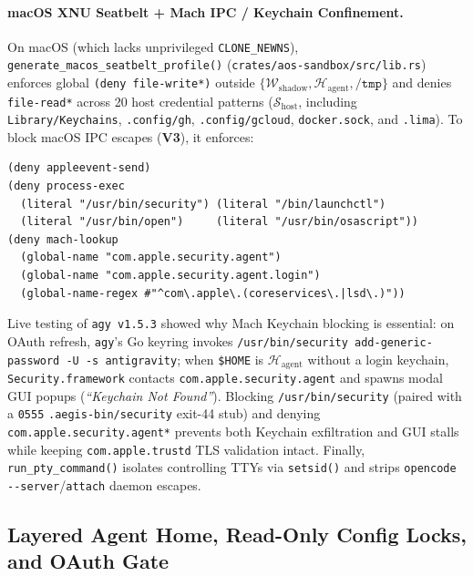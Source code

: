 \documentclass[10pt,twocolumn]{article}
\begin{document}
\paragraph{macOS XNU Seatbelt + Mach IPC / Keychain Confinement.}
On macOS (which lacks unprivileged \texttt{CLONE\_NEWNS}), \texttt{generate\_\allowbreak macos\_\allowbreak seatbelt\_\allowbreak profile()} (\texttt{crates/\allowbreak aos-sandbox/\allowbreak src/\allowbreak lib.rs}) enforces global \texttt{(deny file-write*)} outside $\{\mathcal{W}_{\text{shadow}}, \mathcal{H}_{\text{agent}}, \texttt{/tmp}\}$ and denies \texttt{file-read*} across 20 host credential patterns ($\mathcal{S}_{\text{host}}$, including \texttt{Library/Keychains}, \texttt{.config/gh}, \texttt{.config/gcloud}, \texttt{docker.sock}, and \texttt{.lima}). To block macOS IPC escapes (\textbf{V3}), it enforces:
\begin{lstlisting}
(deny appleevent-send)
(deny process-exec
  (literal "/usr/bin/security") (literal "/bin/launchctl")
  (literal "/usr/bin/open")     (literal "/usr/bin/osascript"))
(deny mach-lookup
  (global-name "com.apple.security.agent")
  (global-name "com.apple.security.agent.login")
  (global-name-regex #"^com\.apple\.(coreservices\.|lsd\.)"))
\end{lstlisting}
Live testing of \texttt{agy v1.5.3} showed why Mach Keychain blocking is essential: on OAuth refresh, \texttt{agy}'s Go keyring invokes \texttt{/usr/bin/security add-generic-password -U -s antigravity}; when \texttt{\$HOME} is $\mathcal{H}_{\text{agent}}$ without a login keychain, \texttt{Security.framework} contacts \texttt{com.apple.security.agent} and spawns modal GUI popups (\emph{``Keychain Not Found''}). Blocking \texttt{/usr/bin/security} (paired with a \texttt{0555} \texttt{.aegis-bin/security} exit-44 stub) and denying \texttt{com.apple.security.agent*} prevents both Keychain exfiltration and GUI stalls while keeping \texttt{com.apple.trustd} TLS validation intact. Finally, \texttt{run\_pty\_command()} isolates controlling TTYs via \texttt{setsid()} and strips \texttt{opencode -\/-server}/\texttt{attach} daemon escapes.

\subsection{Layered Agent Home, Read-Only Config Locks, and OAuth Gate}
\end{document}
